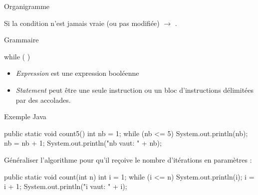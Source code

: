 \begin{frame}{Organigramme}

  \pause
  Si la condition n'est jamais vraie (ou pas modifiée) \(\rightarrow\)
  .
\end{frame}

\begin{frame}[fragile]{Grammaire}
  \begin{grammaire}
    while (  )
  \end{grammaire}

  \begin{itemize}
    \item \textit{Expression} est une expression booléenne
    \item \textit{Statement} peut être une seule instruction ou un bloc
      d'instructions délimitées par des accolades.
  \end{itemize}
\end{frame}

\begin{frame}[fragile]{Exemple Java}
  \begin{java}
public static void count5() {
    int nb = 1;
    while (nb <= 5) {
        System.out.println(nb);
        nb = nb + 1;
    }
    System.out.println("nb vaut: " + nb);
}
  \end{java}
\end{frame}

\begin{frame}[fragile]
  Généraliser l'algorithme pour qu'il reçoive le nombre
  d'itérations en paramètres :
  \pause
  \begin{java}
public static void count(int n) {
    int i = 1;
    while (i <= n) {
        System.out.println(i);
        i = i + 1;
    }
    System.out.println("i vaut: " + i);
}
  \end{java}
\end{frame}

